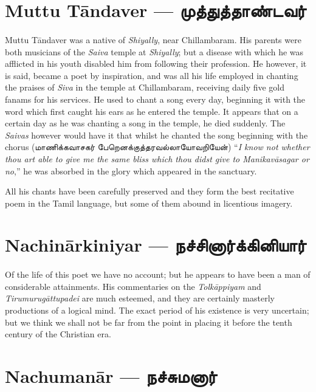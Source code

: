 \documentclass{article}
\newcommand{\TamilText}[1]{\texttamil{#1}}
\newcommand{\TamilBold}[1]{\texttamil{\textbf{#1}}}
\newcommand{\tam}[1]{\TamilText{#1}}
\newcommand{\tambold}[1]{\TamilBold{#1}}
\begin{document}
\section{Muttu T\={a}ndaver --- \tambold{முத்துத்தாண்டவர்}}
\paragraph{}
Muttu T\={a}ndaver was a native of \emph{Shiyally}, near Chillambaram. His parents were both musicians of the \emph{Saiva} temple at \emph{Shiyally}; but a disease with which he was afflicted in his youth disabled him from following their profession. He however, it is said, became a poet by inspiration, and was all his life employed in chanting the praises of \emph{Siva} in the temple at Chillambaram, receiving daily five gold fanams for his services. He used to chant a song every day, beginning it with the word which first caught his ears as he entered the temple. It appears that on a certain day as he was chanting a song in the temple, he died suddenly. The \emph{Saivas} however would have it that whilst he chanted the song beginning with the chorus (\tam{மாணிக்கவாசகர் பேறெனக்குத்தரவல்லாயோவறியேன்}) ``\emph{I know not whether thou art able to give me the same bliss which thou didst give to Manikav\={a}sagar or no},'' he was absorbed in the glory which appeared in the sanctuary.

All his chants have been carefully preserved and they form the best recitative poem in the Tamil language, but some of them abound in licentious imagery.

\section{Nachin\={a}rkiniyar --- \tambold{நச்சினார்க்கினியார்}}
\paragraph{}
Of the life of this poet we have no account; but he appears to have been a man of considerable attainments. His commentaries on the \emph{Tolk\={a}ppiyam} and \emph{Tirumurug\={a}ttupadei} are much esteemed, and they are certainly masterly productions of a logical mind. The exact period of his existence is very uncertain; but we think we shall not be far from the point in placing it before the tenth century of the Christian era.

\section{Nachuman\={a}r --- \tambold{நச்சுமனார்}}
\end{document}

